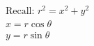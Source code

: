 \documentclass[preview]{standalone}
\begin{document}
\begin{align*}
\text{Recall: }r^2=x^2+y^2\\x=r\cos\theta\\y=r\sin\theta
\end{align*}
\end{document}
